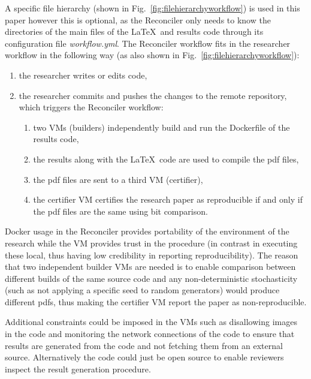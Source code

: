\documentclass[journal]{IEEEtran}
\begin{document}
A specific file hierarchy (shown in Fig.~\ref{fig:filehierarchyworkflow}) is used in this paper however this is optional, as the Reconciler only needs to know the directories of the main files of the \LaTeX\ and results code through its configuration file \textit{workflow.yml}.
The Reconciler workflow fits in the researcher workflow in the following way (as also shown in Fig.~\ref{fig:filehierarchyworkflow}):
\begin{enumerate}
	\item the researcher writes or edits code,
	\item the researcher commits and pushes the changes to the remote repository, which triggers the Reconciler workflow:
		\begin{enumerate}
			\item two VMs (builders) independently build and run the Dockerfile of the results code,
			\item the results along with the \LaTeX\ code are used to compile the pdf files,
			\item the pdf files are sent to a third VM (certifier),
			\item the certifier VM certifies the research paper as reproducible if and only if the pdf files are the same using bit comparison.
		\end{enumerate}
\end{enumerate}

Docker usage in the Reconciler provides portability of the environment of the research while the VM provides trust in the procedure (in contrast in executing these local, thus having low credibility in reporting reproducibility).
The reason that two independent builder VMs are needed is to enable comparison between different builds of the same source code and any non-deterministic stochasticity (such as not applying a specific seed to random generators) would produce different pdfs, thus making the certifier VM report the paper as non-reproducible.

Additional constraints could be imposed in the VMs such as disallowing images in the code and monitoring the network connections of the code to ensure that results are generated from the code and not fetching them from an external source.
Alternatively the code could just be open source to enable reviewers inspect the result generation procedure.
\end{document}
